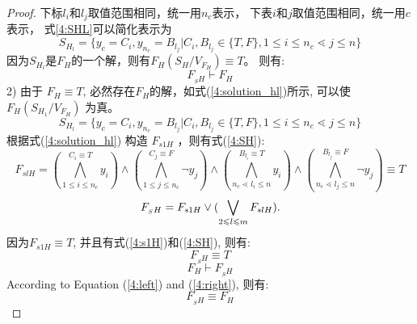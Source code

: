 \begin{proof}
下标$l_i$和$l_j$取值范围相同，统一用$n_c$表示，
下表$i$和$j$取值范围相同，统一用$c$表示，
式\ref{4:SHL}可以简化表示为
\begin{equation}
S_{H_l}=\{y_c=C_i, y_{n_c}=B_{l_j}|C_i,B_{l_j} \in \{T,F\}, 1\leqslant i\leqslant n_c \lessdot j\leqslant n\}
\end{equation}
因为$S_{H_l}$是$F_H$的一个解，则有$F_H(S_H/V_{F_H})\equiv T$。 则有:
\begin{equation}\label{4:left}
 F_{_SH} \vdash F_H
\end{equation}
2) 由于 $F_H\equiv T$, 必然存在$F_H$的解，如式(\ref{4:solution_hl})所示, 可以使$F_H(S_{H_1}/V_{F_H})$ 为真。
\begin{equation}\label{4:solution_hl}
S_{H_l}=\{y_c=C_i, y_{n_c}=B_{l_j}|C_i,B_{l_j} \in \{T,F\}, 1\leqslant i\leqslant n_c \lessdot j\leqslant n\}
\end{equation}
根据式(\ref{4:solution_hl}) 构造 $F_{s1H}$ ，则有式(\ref{4:SH}):
\begin{equation}\label{4:s1H}
F_{slH}=
(\bigwedge_{1\leqslant i\leqslant n_c}^{C_i\equiv T} y_i)\wedge
(\bigwedge_{1\leqslant j\leqslant n_c}^{C_j\equiv F}\neg y_j)\wedge
(\bigwedge_{n_c\lessdot l_i\leqslant n}^{B_{l_i}\equiv T} y_i)\wedge
(\bigwedge_{n_c\lessdot l_j\leqslant n}^{B_{l_j}\equiv F}\neg y_j)
 \equiv T
\end{equation}
\begin{equation}\label{4:SH}
F_{_SH} =F_ {s1H} \vee (\bigvee_{2\leqslant l\leqslant m}F_{slH}). \\
\end{equation}
因为$F_{s1H} \equiv T$, 并且有式(\ref{4:s1H})和(\ref{4:SH}), 则有:
\begin{equation}
F_{_SH}  \equiv T
\end{equation}
\begin{equation}\label{4:right}
F_H \vdash F_{_SH}
\end{equation}
According to Equation (\ref{4:left}) and (\ref{4:right}), 则有:
\begin{equation}
 F_{_SH} \equiv F_H
\end{equation}
\end{proof}

